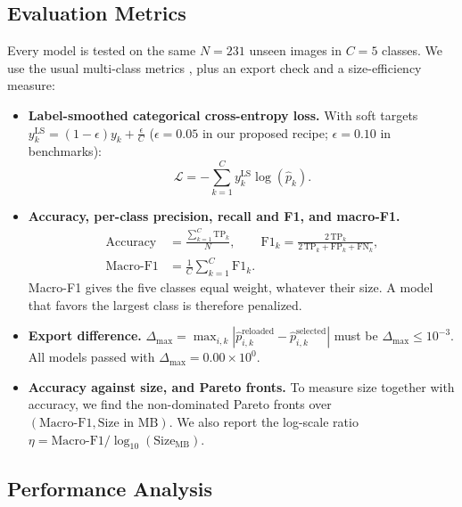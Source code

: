 \subsection{Evaluation Metrics}
Every model is tested on the same $N = 231$ unseen images in $C = 5$ classes. We use the usual multi-class metrics \cite{grandini2020metrics}, plus an export check and a size-efficiency measure:
\begin{itemize}
    \item \textbf{Label-smoothed categorical cross-entropy loss.} With soft targets $y^{\text{LS}}_k = (1 - \epsilon) y_k + \frac{\epsilon}{C}$ ($\epsilon = 0.05$ in our proposed recipe; $\epsilon = 0.10$ in benchmarks):
    \begin{equation}
    \mathcal{L} = -\sum_{k=1}^{C} y^{\text{LS}}_k \log(\hat{p}_k).
    \end{equation}
    \item \textbf{Accuracy, per-class precision, recall and F1, and macro-F1.}
    \begin{equation}
    \begin{aligned}
    \text{Accuracy} &= \frac{\sum_{k=1}^{C} \text{TP}_k}{N}, \qquad
    \text{F1}_k = \frac{2\,\text{TP}_k}{2\,\text{TP}_k + \text{FP}_k + \text{FN}_k}, \\
    \text{Macro-F1} &= \frac{1}{C} \sum_{k=1}^{C} \text{F1}_k.
    \end{aligned}
    \end{equation}
    Macro-F1 gives the five classes equal weight, whatever their size. A model that favors the largest class is therefore penalized.
    \item \textbf{Export difference.} $\Delta_{\max} = \max_{i,k} |\hat{p}^{\text{reloaded}}_{i,k} - \hat{p}^{\text{selected}}_{i,k}|$ must be $\Delta_{\max} \le 10^{-3}$. All models passed with $\Delta_{\max} = 0.00 \times 10^{0}$.
    \item \textbf{Accuracy against size, and Pareto fronts.} To measure size together with accuracy, we find the non-dominated Pareto fronts over $(\text{Macro-F1}, \text{Size in MB})$. We also report the log-scale ratio $\eta = \text{Macro-F1} / \log_{10}(\text{Size}_{\text{MB}})$.
\end{itemize}

\subsection{Performance Analysis}

